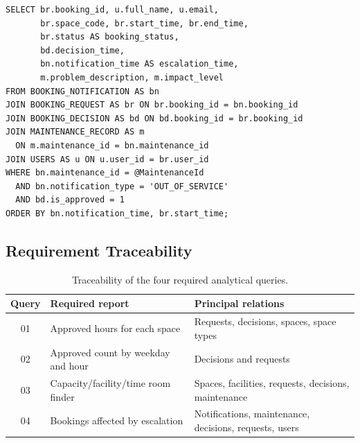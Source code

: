 \begin{lstlisting}[caption={Core of Query 04.}]
SELECT br.booking_id, u.full_name, u.email,
       br.space_code, br.start_time, br.end_time,
       br.status AS booking_status,
       bd.decision_time,
       bn.notification_time AS escalation_time,
       m.problem_description, m.impact_level
FROM BOOKING_NOTIFICATION AS bn
JOIN BOOKING_REQUEST AS br ON br.booking_id = bn.booking_id
JOIN BOOKING_DECISION AS bd ON bd.booking_id = br.booking_id
JOIN MAINTENANCE_RECORD AS m
  ON m.maintenance_id = bn.maintenance_id
JOIN USERS AS u ON u.user_id = br.user_id
WHERE bn.maintenance_id = @MaintenanceId
  AND bn.notification_type = 'OUT_OF_SERVICE'
  AND bd.is_approved = 1
ORDER BY bn.notification_time, br.start_time;
\end{lstlisting}

\subsection{Requirement Traceability}

\begin{table}[H]
  \centering
  \small
  \begin{tabularx}{\textwidth}{c>{\raggedright\arraybackslash}p{5.1cm}X}
    \toprule
    \textbf{Query} & \textbf{Required report} & \textbf{Principal relations}\\
    \midrule
    01 & Approved hours for each space & Requests, decisions, spaces, space types\\
    02 & Approved count by weekday and hour & Decisions and requests\\
    03 & Capacity/facility/time room finder & Spaces, facilities, requests, decisions, maintenance\\
    04 & Bookings affected by escalation & Notifications, maintenance, decisions, requests, users\\
    \bottomrule
  \end{tabularx}
  \caption{Traceability of the four required analytical queries.}
\end{table}
